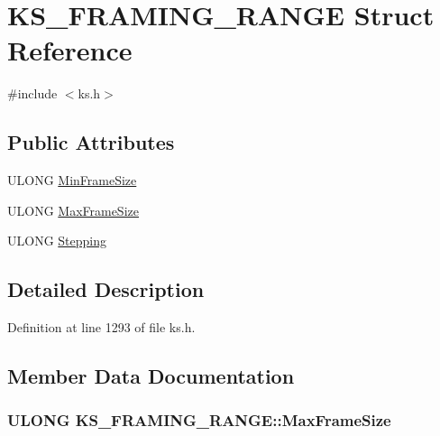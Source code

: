 \hypertarget{struct_k_s___f_r_a_m_i_n_g___r_a_n_g_e}{}\section{K\+S\+\_\+\+F\+R\+A\+M\+I\+N\+G\+\_\+\+R\+A\+N\+GE Struct Reference}
\label{struct_k_s___f_r_a_m_i_n_g___r_a_n_g_e}


{\ttfamily \#include $<$ks.\+h$>$}

\subsection*{Public Attributes}
\begin{DoxyCompactItemize}
\item 
U\+L\+O\+NG \hyperlink{struct_k_s___f_r_a_m_i_n_g___r_a_n_g_e_ac7091ebd791a42498b4694e0dba4456f}{Min\+Frame\+Size}
\item 
U\+L\+O\+NG \hyperlink{struct_k_s___f_r_a_m_i_n_g___r_a_n_g_e_a2c17c3b22db1cad07559eb69b489d569}{Max\+Frame\+Size}
\item 
U\+L\+O\+NG \hyperlink{struct_k_s___f_r_a_m_i_n_g___r_a_n_g_e_a71fde719551b13f41fe6a6449866345d}{Stepping}
\end{DoxyCompactItemize}


\subsection{Detailed Description}


Definition at line 1293 of file ks.\+h.



\subsection{Member Data Documentation}
\subsubsection[{\texorpdfstring{Max\+Frame\+Size}{MaxFrameSize}}]{\setlength{\rightskip}{0pt plus 5cm}U\+L\+O\+NG K\+S\+\_\+\+F\+R\+A\+M\+I\+N\+G\+\_\+\+R\+A\+N\+G\+E\+::\+Max\+Frame\+Size}\hypertarget{struct_k_s___f_r_a_m_i_n_g___r_a_n_g_e_a2c17c3b22db1cad07559eb69b489d569}{}\label{struct_k_s___f_r_a_m_i_n_g___r_a_n_g_e_a2c17c3b22db1cad07559eb69b489d569}


